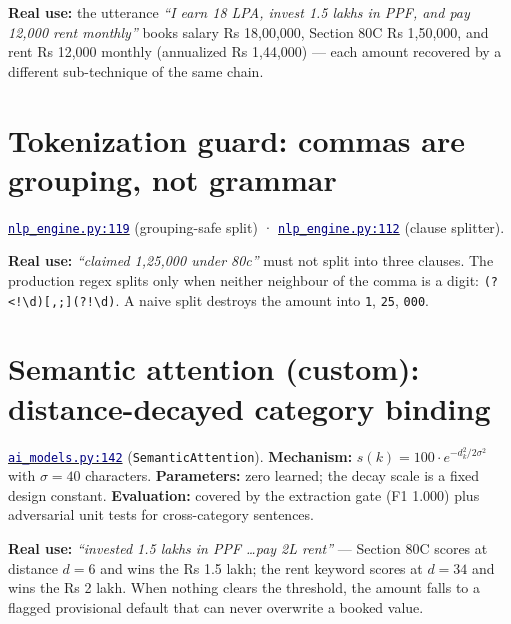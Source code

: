 \documentclass[11pt,a4paper]{article}
\newcommand{\code}[2]{\href{https://github.com/Jayant1711/Tax_Assist-system/blob/v0.7-sprint7/#1}{\texttt{\textcolor{navy}{#2}}}}
\newcommand{\facts}[1]{{\small\textcolor{muted}{#1}\par}}
\begin{document}
\begin{examplebox}
\textbf{Real use:} the utterance \emph{``I earn 18 LPA, invest 1.5 lakhs in PPF,
and pay 12,000 rent monthly''} books salary Rs 18,00,000, Section 80C
Rs 1,50,000, and rent Rs 12,000 monthly (annualized Rs 1,44,000) --- each amount
recovered by a different sub-technique of the same chain.
\end{examplebox}

\section{Tokenization guard: commas are grouping, not grammar}
\facts{\code{backend/nlp\_engine.py}{nlp\_engine.py:119} (grouping-safe split) ·
\code{backend/nlp\_engine.py}{nlp\_engine.py:112} (clause splitter).}

\begin{examplebox}
\textbf{Real use:} \emph{``claimed 1,25,000 under 80c''} must not split into three
clauses. The production regex splits only when neither neighbour of the comma is
a digit: \texttt{(?<!\textbackslash d)[,;](?!\textbackslash d)}. A naive split
destroys the amount into \texttt{1}, \texttt{25}, \texttt{000}.
\end{examplebox}

\section{Semantic attention (custom): distance-decayed category binding}
\facts{\code{backend/ai\_models.py}{ai\_models.py:142}
(\texttt{SemanticAttention}). \textbf{Mechanism:}
$s(k) = 100 \cdot e^{-d_k^2/2\sigma^2}$ with $\sigma = 40$ characters.
\textbf{Parameters:} zero learned; the decay scale is a fixed design constant.
\textbf{Evaluation:} covered by the extraction gate (F1 1.000) plus adversarial
unit tests for cross-category sentences.}

\begin{examplebox}
\textbf{Real use:} \emph{``invested 1.5 lakhs in PPF \ldots pay 2L rent''} ---
Section 80C scores at distance $d{=}6$ and wins the Rs 1.5 lakh; the rent
keyword scores at $d{=}34$ and wins the Rs 2 lakh. When nothing clears the
threshold, the amount falls to a flagged provisional default that can never
overwrite a booked value.
\end{examplebox}
\end{document}
